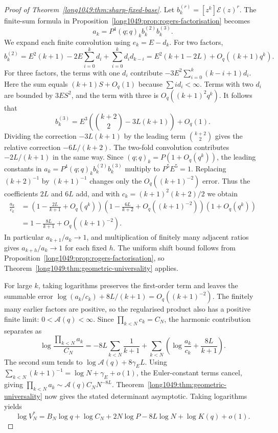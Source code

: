 \documentclass[11pt]{article}
\begin{document}
\begin{proof}[Proof of Theorem~\ref{long1049:thm:sharp-fixed-base}]
Let $b_k^{(r)}=[z^k]\mathcal E(z)^r$. The finite-sum formula in
Proposition~\ref{long1049:prop:rogers-factorisation} becomes
\[
 a_k=P^4(q;q)_k b_k^{(2)}b_k^{(3)}.
\]
We expand each finite convolution using $e_k=E-d_k$. For two factors,
\[
 b_k^{(2)}=E^2(k+1)-2E\sum_{i=0}^k d_i
              +\sum_{i=0}^k d_i d_{k-i}
 =E^2(k+1-2L)+O_q((k+1)q^k).
\]
For three factors, the terms with one $d_i$ contribute
$-3E^2\sum_{i=0}^k(k-i+1)d_i$.
Here the sum equals $(k+1)S+O_q(1)$ because
$\sum i d_i<\infty$. Terms with two $d_i$ are bounded by
$3E S^2$, and the term with three is $O_q((k+1)^2q^k)$.
It follows that
\[
 b_k^{(3)}=E^3\left(\binom{k+2}{2}-3L(k+1)\right)+O_q(1).
\]
Dividing the correction $-3L(k+1)$ by the leading term
$\binom{k+2}{2}$ gives the relative correction $-6L/(k+2)$.
The two-fold convolution contributes $-2L/(k+1)$ in the same way.
Since $(q;q)_k=P(1+O_q(q^k))$, the leading constants in
$a_k=P^4(q;q)_k b_k^{(2)}b_k^{(3)}$ multiply to $P^5E^5=1$.
Replacing $(k+2)^{-1}$ by $(k+1)^{-1}$ changes only the
$O_q((k+1)^{-2})$ error. Thus the coefficients $2L$ and $6L$ add,
and with $c_k=(k+1)^2(k+2)/2$ we obtain
\begin{align*}
 \frac{a_k}{c_k}
 &=\left(1-\frac{2L}{k+1}+O_q(q^k)\right)
   \left(1-\frac{6L}{k+2}+O_q((k+1)^{-2})\right)
   \left(1+O_q(q^k)\right)\\
 &=1-\frac{8L}{k+1}+O_q((k+1)^{-2}).
\end{align*}
In particular $a_{k+1}/a_k\to1$, and multiplication of finitely
many adjacent ratios gives $a_{k+h}/a_k\to1$ for each fixed $h$.
The uniform shift bound follows from
Proposition~\ref{long1049:prop:rogers-factorisation}, so
Theorem~\ref{long1049:thm:geometric-universality} applies.

For large $k$, taking logarithms preserves the first-order term and
leaves the summable error
$\log(a_k/c_k)+8L/(k+1)=O_q((k+1)^{-2})$.
The finitely many earlier factors are positive, so the regularised
product also has a positive finite limit: $0<\mathcal A(q)<\infty$.
Since $\prod_{k<N}c_k=C_N$, the harmonic contribution separates as
\[
 \log\frac{\prod_{k<N}a_k}{C_N}
 =-8L\sum_{k<N}\frac1{k+1}
  +\sum_{k<N}\left(\log\frac{a_k}{c_k}+\frac{8L}{k+1}\right).
\]
The second sum tends to $\log\mathcal A(q)+8\gamma_{\!E}L$.
Using $\sum_{k<N}(k+1)^{-1}=\log N+\gamma_{\!E}+o(1)$,
the Euler-constant terms cancel, giving
$\prod_{k<N}a_k\sim\mathcal A(q)C_NN^{-8L}$.
Theorem~\ref{long1049:thm:geometric-universality} now gives the
stated determinant asymptotic. Taking logarithms yields
\[
 \log V_N^*=B_N\log q+\log C_N+2N\log P
             -8L\log N+\log K(q)+o(1).
\]
\end{proof}
\end{document}
